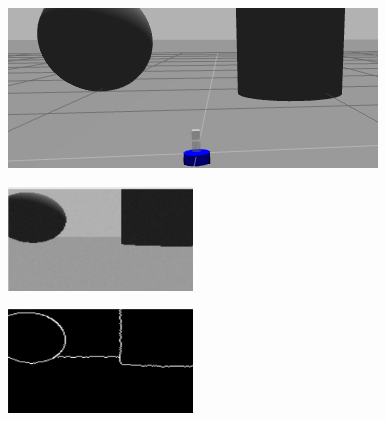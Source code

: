 \documentclass[conference]{IEEEtran}
\begin{document}
\begin{figure}[h]
\centering
\begin{minipage}{0.96\linewidth}
  \centering
  \includegraphics[width=\linewidth]{camera_world2.png}
  \label{fig:cameraWorld}
\end{minipage}\newline
\begin{minipage}{.45\linewidth}
  \centering
  \includegraphics[width=\linewidth]{camera.png}
  \label{fig:camera}
\end{minipage}\quad
\begin{minipage}{.45\linewidth}
  \centering
  \includegraphics[width=\linewidth]{lines.png}
  \label{fig:lines}
\end{minipage}
\end{figure}
\end{document}

